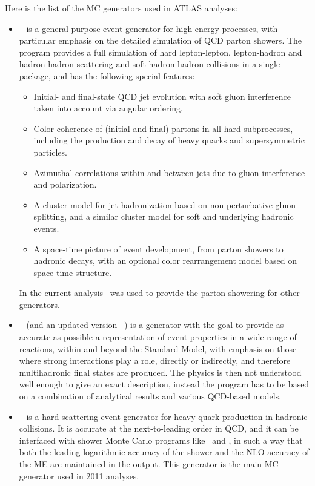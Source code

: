 Here is the list of the MC generators used in ATLAS analyses:
\begin{itemize}
\item \Herwig~\cite{lib:MC_herwig} is a general-purpose event generator for high-energy processes, with particular emphasis on the detailed simulation of QCD parton showers. The program provides a full simulation of hard lepton-lepton, lepton-hadron and hadron-hadron scattering and soft hadron-hadron collisions in a single package, and has the following special features:
\begin{itemize}
\item Initial- and final-state QCD jet evolution with soft gluon interference taken into account via angular ordering.
\item Color coherence of (initial and final) partons in all hard subprocesses, including the production and decay of heavy quarks and supersymmetric particles.
\item Azimuthal correlations within and between jets due to gluon interference and polarization.
\item A cluster model for jet hadronization based on non-perturbative gluon splitting, and a similar cluster model for soft and underlying hadronic events.
\item A space-time picture of event development, from parton showers to hadronic decays, with an optional color rearrangement model based on space-time structure.
\end{itemize}
In the current analysis \Herwig\ was used to provide the parton showering for other generators.

\item \Pythia~\cite{lib:MC_pythia6} (and an updated version \Pythiaeight~\cite{lib:MC_pythia8}) is a generator with the goal to provide as accurate as possible a representation of event properties in a wide range of reactions, within and beyond the Standard Model, with emphasis on those where strong interactions play a role, directly or indirectly, and therefore multihadronic final states are produced. The physics is then not understood well enough to give an exact description, instead the program has to be based on a combination of analytical results and various QCD-based models.

\item \Powheg~\cite{lib:MC_powheg} is a hard scattering event generator for heavy quark production in hadronic collisions. It is accurate at the next-to-leading order in QCD, and it can be interfaced with shower Monte Carlo programs like \Herwig\ and \Pythia, in such a way that both the leading logarithmic accuracy of the shower and the NLO accuracy of the ME are maintained in the output. This generator is the main MC generator used in 2011 analyses.


\end{itemize}
